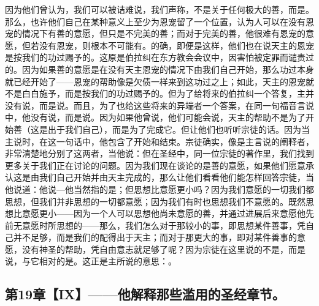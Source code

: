 因为他们曾认为，我们可以被诘难说，我们声称，不是关于任何极大的善，而是。那么，也许他们自己在某种意义上至少为恩宠留了一个位置，认为人可以在没有恩宠的情况下有善的意愿，但只是不完美的善；而对于完美的善，他很难有恩宠的意愿，但若没有恩宠，则根本不可能有。的确，即便是这样，他们也在说天主的恩宠是按我们的功过赐予的。这原是伯拉纠在东方教会会议中，因害怕被定罪而谴责过的。因为如果善的意愿是在没有天主恩宠的情况下由我们自己开始，那么功过本身就已经开始了——恩宠的帮助像是欠债一样来到这功过之上；如此，天主的恩宠就不是白白施予，而是按我们的功过赐予的。但为了给将来的伯拉纠一个答复，主并没有说，而是说。而且，为了也给这些将来的异端者一个答案，在同一句福音言说中，他没有说，而是说。因为如果他曾说，他们可能会说，天主的帮助不是为了开始善（这是出于我们自己），而是为了完成它。但让他们也听听宗徒的话。因为当主说时，在这一句话中，他包含了开始和结束。宗徒确实，像是主言说的阐释者，非常清楚地分别了这两者，当他说：但在圣经中，同一位宗徒的著作里，我们找到更多关于我们正在讨论的问题。因为我们现在谈论的是善的意愿，如果他们愿意承认这是由我们自己开始并由天主完成的，那么让他们看看他们能怎样回答宗徒，当他说道：他说—他当然指的是；但思想比意愿更小吗？因为我们意愿的一切我们都思想，但我们并非思想的一切都意愿；因为我们有时也思想我们不意愿的。既然思想比意愿更小——因为一个人可以思想他尚未意愿的善，并通过进展后来意愿他先前无意愿时所思想的——那么，我们怎么对于那较小的事，即思想某件善事，凭自己并不足够，而是我们的配得出于天主；而对于那更大的事，即对某件善事的意愿，没有神圣的帮助，凭自由意志就足够了呢？因为宗徒在这里说的不是，而是说，与它相对的是。这正是主所说的意思：。\par


\subsection{第19章【IX】——他解释那些滥用的圣经章节。}

